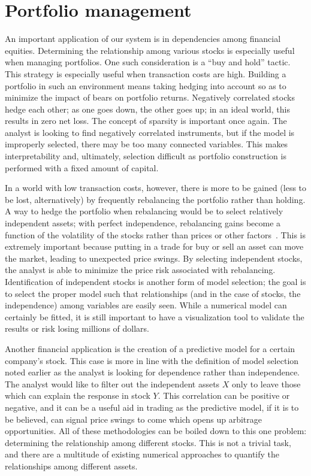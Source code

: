\section{Portfolio management}
\label{sec:intro:finance}

An important application of our system is in dependencies among financial equities. Determining the relationship among various stocks is especially useful when managing portfolios. One such consideration is a ``buy and hold'' tactic. This strategy is especially useful when transaction costs are high. Building a portfolio in such an environment means taking hedging into account so as to minimize the impact of bears on portfolio returns. Negatively correlated stocks hedge each other; as one goes down, the other goes up; in an ideal world, this results in zero net loss. The concept of sparsity is important once again. The analyst is looking to find negatively correlated instruments, but if the model is improperly selected, there may be too many connected variables. This makes interpretability and, ultimately, selection difficult as portfolio construction is performed with a fixed amount of capital.

In a world with low transaction costs, however, there is more to be gained (less to be lost, alternatively) by frequently rebalancing the portfolio rather than holding. A way to hedge the portfolio when rebalancing would be to select relatively independent assets; with perfect independence, rebalancing gains become a function of the volatility of the stocks rather than prices or other factors~\cite{liuh2016}. This is extremely important because putting in a trade for buy or sell an asset can move the market, leading to unexpected price swings. By selecting independent stocks, the analyst is able to minimize the price risk associated with rebalancing. Identification of independent stocks is another form of model selection; the goal is to select the proper model such that relationships (and in the case of stocks, the independence) among variables are easily seen. While a numerical model can certainly be fitted, it is still important to have a visualization tool to validate the results or risk losing millions of dollars.

Another financial application is the creation of a predictive model for a certain company's stock. This case is more in line with the definition of model selection noted earlier as the analyst is looking for dependence rather than independence. The analyst would like to filter out the independent assets $X$ only to leave those which can explain the response in stock $Y$. This correlation can be positive or negative, and it can be a useful aid in trading as the predictive model, if it is to be believed, can signal price swings to come which opens up arbitrage opportunities. All of these methodologies can be boiled down to this one problem: determining the relationship among different stocks. This is not a trivial task, and there are a multitude of existing numerical approaches to quantify the relationships among different assets. 